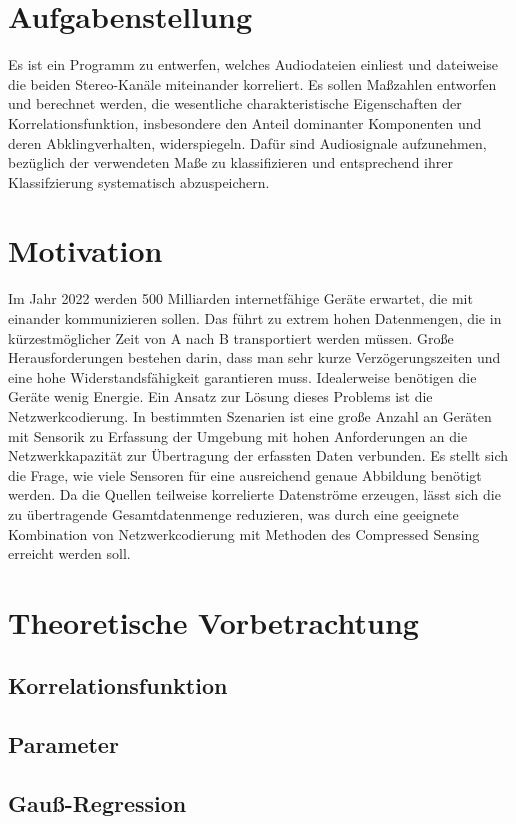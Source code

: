 \section{Aufgabenstellung}
Es ist ein Programm zu entwerfen, welches Audiodateien einliest und dateiweise die beiden Stereo-Kanäle miteinander korreliert. Es sollen Maßzahlen entworfen und berechnet werden, die wesentliche charakteristische Eigenschaften der Korrelationsfunktion, insbesondere den Anteil dominanter Komponenten und deren Abklingverhalten, widerspiegeln. Dafür sind Audiosignale aufzunehmen, bezüglich der verwendeten Maße zu klassifizieren und entsprechend ihrer Klassifzierung systematisch abzuspeichern.
\section{Motivation}
Im Jahr 2022 werden 500 Milliarden internetfähige Geräte erwartet, die mit einander kommunizieren sollen. Das führt zu extrem hohen Datenmengen, die in kürzestmöglicher Zeit von A nach B transportiert werden müssen. Große Herausforderungen bestehen darin, dass man sehr kurze Verzögerungszeiten und eine hohe Widerstandsfähigkeit garantieren muss. Idealerweise benötigen die Geräte wenig Energie. Ein Ansatz zur Lösung dieses Problems ist die Netzwerkcodierung.\newline
In bestimmten Szenarien ist eine große Anzahl an Geräten mit Sensorik zu Erfassung der Umgebung mit hohen Anforderungen an die Netzwerkkapazität zur Übertragung der erfassten Daten verbunden. Es stellt sich die Frage, wie viele Sensoren für eine ausreichend genaue Abbildung benötigt werden. Da die Quellen teilweise korrelierte Datenströme erzeugen, lässt sich die zu übertragende Gesamtdatenmenge reduzieren, was durch eine geeignete Kombination von Netzwerkcodierung mit Methoden des Compressed Sensing erreicht werden soll.

\section{Theoretische Vorbetrachtung}
\subsection{Korrelationsfunktion}
\subsection{Parameter}
\subsection{Gauß-Regression}

